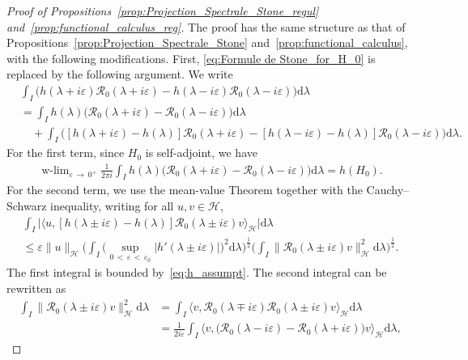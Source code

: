 \documentclass[10pt]{amsart}
\theoremstyle{definition}\newtheorem{defi}[theo]{Definition}\newtheorem{rema}[theo]{Remark}\newtheorem{exam}[theo]{Example}\newtheorem{exem}[theo]{Example}\newtheorem{nota}[theo]{Notation}
\newcommand{\Hi}{\mathcal{H}}
\newcommand{\rmd}{\mathrm{d}}
\newcommand{\Res}{\mathcal{R}}
\DeclareMathOperator{\wlim}{w-lim}
\begin{document}
\begin{proof}[Proof of Propositions~\ref{prop:Projection_Spectrale_Stone_regul} and~\ref{prop:functional_calculus_reg}]
The proof has the same structure as that of Propositions~\ref{prop:Projection_Spectrale_Stone} and~\ref{prop:functional_calculus}, with the following modifications. First, \eqref{eq:Formule de Stone_for_H_0} is replaced by the following argument. We write
\begin{align*}
&\int_I\big(h(\lambda+i\varepsilon)\Res_{0}(\lambda+i\varepsilon)-h(\lambda-i\varepsilon)\Res_{0}(\lambda-i\varepsilon)\big)\rmd \lambda\\
&=\int_Ih(\lambda)\big(\Res_{0}(\lambda+i\varepsilon)-\Res_{0}(\lambda-i\varepsilon)\big)\rmd \lambda\\
&\quad+\int_I\big([h(\lambda+i\varepsilon)-h(\lambda)]\Res_{0}(\lambda+i\varepsilon)-[h(\lambda-i\varepsilon)-h(\lambda)]\Res_{0}(\lambda-i\varepsilon)\big)\rmd \lambda.
\end{align*}
For the first term, since $H_0$ is self-adjoint, we have
\begin{align}\label{eq:v1}
\wlim_{\varepsilon\,\rightarrow\,0^+}\frac{1}{2\pi i}\int_Ih(\lambda)\big(\Res_{0}(\lambda+i\varepsilon)-\Res_{0}(\lambda-i\varepsilon)\big)\rmd \lambda=h(H_0). 
\end{align}
For the second term, we use the mean-value Theorem together with the Cauchy--Schwarz inequality, writing for all $u,v\in\Hi$,
\begin{multline}\label{eq:v2}
\int_I\big|\big\langle u,[h(\lambda\pm i\varepsilon)-h(\lambda)]\Res_{0}(\lambda\pm i\varepsilon)v\big\rangle_\Hi\big|\rmd \lambda\\
\le\varepsilon\|u\|_\Hi\Big(\int_I \Big(\sup_{0\,<\,\varepsilon\,<\,\varepsilon_0}|h'(\lambda\pm i\varepsilon)| \Big)^2\rmd \lambda\Big)^{\frac12}\Big(\int_I\big\|\Res_{0}(\lambda\pm i\varepsilon)v\big\|_\Hi^2\rmd \lambda\Big)^{\frac12}. 
\end{multline}
The first integral is bounded by~\eqref{eq:h_assumpt}. The second integral can be rewritten as
\begin{equation}\label{eq:v3}
\begin{split}
\int_I\big\|\Res_{0}(\lambda\pm i\varepsilon)v\big\|_\Hi^2\rmd \lambda &=\int_I\big\langle v,\Res_{0}(\lambda\mp i\varepsilon)\Res_{0}(\lambda\pm i\varepsilon)v\big\rangle_\Hi\rmd \lambda \\
&=\frac{1}{2i\varepsilon}\int_I\big\langle v,\big(\Res_{0}(\lambda-i\varepsilon)-\Res_{0}(\lambda+i\varepsilon)\big)v\big\rangle_\Hi\rmd \lambda, 

\end{split}
\end{equation}
\end{proof}
\end{document}
